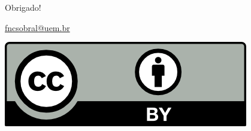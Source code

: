 \documentclass[]{beamer}
\begin{document}
\begin{frame}
  \vfill
  \vfill
  \vfill
  \begin{center}
    \Huge Obrigado!
  \end{center}
  \vfill
  \vfill
  \begin{center} \url{fncsobral@uem.br} \end{center}

  \begin{center}
    \href{http://creativecommons.org/licenses/by/4.0/}{\includegraphics{figures/by.png}} \end{center}
\end{frame}
\end{document}
